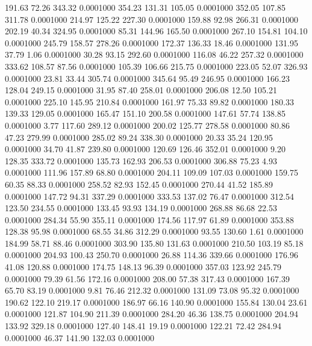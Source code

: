  191.63   72.26  343.32   0.0001000
 354.23  131.31  105.05   0.0001000
 352.05  107.85  311.78   0.0001000
 214.97  125.22  227.30   0.0001000
 159.88   92.98  266.31   0.0001000
 202.19   40.34  324.95   0.0001000
  85.31  144.96  165.50   0.0001000
 267.10  154.81  104.10   0.0001000
 245.79  158.57  278.26   0.0001000
 172.37  136.33   18.46   0.0001000
 131.95   37.79    1.06   0.0001000
  30.28   93.15  292.60   0.0001000
 116.08   46.22  257.32   0.0001000
 333.62  108.57   87.56   0.0001000
 105.39  106.66  215.75   0.0001000
 223.05   52.07  326.93   0.0001000
  23.81   33.44  305.74   0.0001000
 345.64   95.49  246.95   0.0001000
 166.23  128.04  249.15   0.0001000
  31.95   87.40  258.01   0.0001000
 206.08   12.50  105.21   0.0001000
 225.10  145.95  210.84   0.0001000
 161.97   75.33   89.82   0.0001000
 180.33  139.33  129.05   0.0001000
 165.47  151.10  200.58   0.0001000
 147.61   57.74  138.85   0.0001000
   3.77  117.60  289.12   0.0001000
 200.02  125.77  278.58   0.0001000
  80.86   47.23  279.99   0.0001000
 285.02   89.24  338.30   0.0001000
  20.33   35.24  120.95   0.0001000
  34.70   41.87  239.80   0.0001000
 120.69  126.46  352.01   0.0001000
   9.20  128.35  333.72   0.0001000
 135.73  162.93  206.53   0.0001000
 306.88   75.23    4.93   0.0001000
 111.96  157.89   68.80   0.0001000
 204.11  109.09  107.03   0.0001000
 159.75   60.35   88.33   0.0001000
 258.52   82.93  152.45   0.0001000
 270.44   41.52  185.89   0.0001000
 147.72   94.31  337.29   0.0001000
 333.53  137.02   76.47   0.0001000
 312.54  123.50  234.55   0.0001000
 133.45   93.93  134.19   0.0001000
 268.88   86.68   22.53   0.0001000
 284.34   55.90  355.11   0.0001000
 174.56  117.97   61.89   0.0001000
 353.88  128.38   95.98   0.0001000
  68.55   34.86  312.29   0.0001000
  93.55  130.60    1.61   0.0001000
 184.99   58.71   88.46   0.0001000
 303.90  135.80  131.63   0.0001000
 210.50  103.19   85.18   0.0001000
 204.93  100.43  250.70   0.0001000
  26.88  114.36  339.66   0.0001000
 176.96   41.08  120.88   0.0001000
 174.75  148.13   96.39   0.0001000
 357.03  123.92  245.79   0.0001000
  79.39   61.56  172.16   0.0001000
 208.00   57.38  317.43   0.0001000
 167.39   65.70   83.19   0.0001000
   9.81   76.46  212.32   0.0001000
 131.09   73.08   95.32   0.0001000
 190.62  122.10  219.17   0.0001000
 186.97   66.16  140.90   0.0001000
 155.84  130.04   23.61   0.0001000
 121.87  104.90  211.39   0.0001000
 284.20   46.36  138.75   0.0001000
 204.94  133.92  329.18   0.0001000
 127.40  148.41   19.19   0.0001000
 122.21   72.42  284.94   0.0001000
  46.37  141.90  132.03   0.0001000
